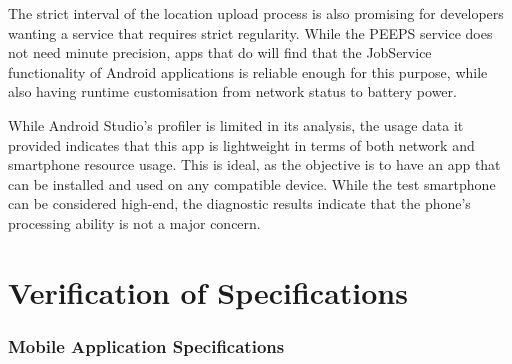 The strict interval of the location upload process is also promising for developers wanting a service that requires strict regularity. While the PEEPS service does not need minute precision, apps that do will find that the JobService functionality of Android applications is reliable enough for this purpose, while also having runtime customisation from network status to battery power. 

While Android Studio's profiler is limited in its analysis, the usage data it provided indicates that this app is lightweight in terms of both network and smartphone resource usage. This is ideal, as the objective is to have an app that can be installed and used on any compatible device. While the test smartphone can be considered high-end, the diagnostic results indicate that the phone's processing ability is not a major concern.

\section{Verification of Specifications}

\subsubsection{Mobile Application Specifications}

